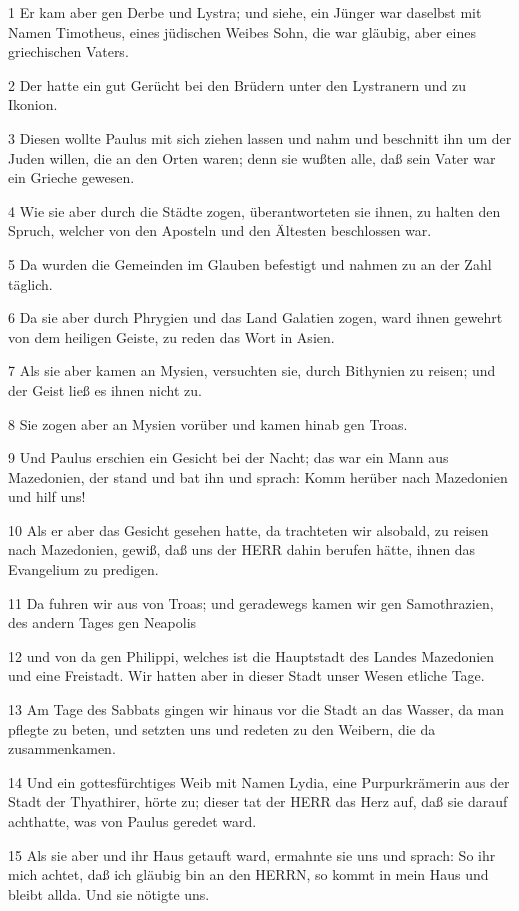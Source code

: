 \par 1 Er kam aber gen Derbe und Lystra; und siehe, ein Jünger war daselbst mit Namen Timotheus, eines jüdischen Weibes Sohn, die war gläubig, aber eines griechischen Vaters.
\par 2 Der hatte ein gut Gerücht bei den Brüdern unter den Lystranern und zu Ikonion.
\par 3 Diesen wollte Paulus mit sich ziehen lassen und nahm und beschnitt ihn um der Juden willen, die an den Orten waren; denn sie wußten alle, daß sein Vater war ein Grieche gewesen.
\par 4 Wie sie aber durch die Städte zogen, überantworteten sie ihnen, zu halten den Spruch, welcher von den Aposteln und den Ältesten beschlossen war.
\par 5 Da wurden die Gemeinden im Glauben befestigt und nahmen zu an der Zahl täglich.
\par 6 Da sie aber durch Phrygien und das Land Galatien zogen, ward ihnen gewehrt von dem heiligen Geiste, zu reden das Wort in Asien.
\par 7 Als sie aber kamen an Mysien, versuchten sie, durch Bithynien zu reisen; und der Geist ließ es ihnen nicht zu.
\par 8 Sie zogen aber an Mysien vorüber und kamen hinab gen Troas.
\par 9 Und Paulus erschien ein Gesicht bei der Nacht; das war ein Mann aus Mazedonien, der stand und bat ihn und sprach: Komm herüber nach Mazedonien und hilf uns!
\par 10 Als er aber das Gesicht gesehen hatte, da trachteten wir alsobald, zu reisen nach Mazedonien, gewiß, daß uns der HERR dahin berufen hätte, ihnen das Evangelium zu predigen.
\par 11 Da fuhren wir aus von Troas; und geradewegs kamen wir gen Samothrazien, des andern Tages gen Neapolis
\par 12 und von da gen Philippi, welches ist die Hauptstadt des Landes Mazedonien und eine Freistadt. Wir hatten aber in dieser Stadt unser Wesen etliche Tage.
\par 13 Am Tage des Sabbats gingen wir hinaus vor die Stadt an das Wasser, da man pflegte zu beten, und setzten uns und redeten zu den Weibern, die da zusammenkamen.
\par 14 Und ein gottesfürchtiges Weib mit Namen Lydia, eine Purpurkrämerin aus der Stadt der Thyathirer, hörte zu; dieser tat der HERR das Herz auf, daß sie darauf achthatte, was von Paulus geredet ward.
\par 15 Als sie aber und ihr Haus getauft ward, ermahnte sie uns und sprach: So ihr mich achtet, daß ich gläubig bin an den HERRN, so kommt in mein Haus und bleibt allda. Und sie nötigte uns.
